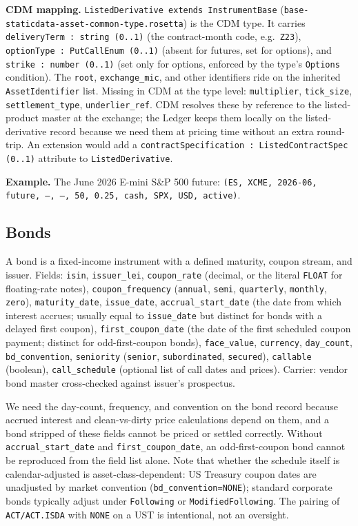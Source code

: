 \documentclass[11pt,a4paper]{article}
\begin{document}
\textbf{CDM mapping.} \texttt{ListedDerivative extends InstrumentBase} (\texttt{base-staticdata-asset-common-type.rosetta}) is the CDM type. It carries \texttt{deliveryTerm : string (0..1)} (the contract-month code, e.g.\ \texttt{Z23}), \texttt{optionType : PutCallEnum (0..1)} (absent for futures, set for options), and \texttt{strike : number (0..1)} (set only for options, enforced by the type's \texttt{Options} condition). The \texttt{root}, \texttt{exchange\_mic}, and other identifiers ride on the inherited \texttt{AssetIdentifier} list. Missing in CDM at the type level: \texttt{multiplier}, \texttt{tick\_size}, \texttt{settlement\_type}, \texttt{underlier\_ref}. CDM resolves these by reference to the listed-product master at the exchange; the Ledger keeps them locally on the listed-derivative record because we need them at pricing time without an extra round-trip. An extension would add a \texttt{contractSpecification : ListedContractSpec (0..1)} attribute to \texttt{ListedDerivative}.

\textbf{Example.} The June 2026 E-mini S\&P 500 future: \texttt{(ES, XCME, 2026-06, future, ---, ---, 50, 0.25, cash, SPX, USD, active)}.

\subsection{Bonds}

A bond is a fixed-income instrument with a defined maturity, coupon stream, and issuer. Fields: \texttt{isin}, \texttt{issuer\_lei}, \texttt{coupon\_rate} (decimal, or the literal \texttt{FLOAT} for floating-rate notes), \texttt{coupon\_frequency} (\texttt{annual}, \texttt{semi}, \texttt{quarterly}, \texttt{monthly}, \texttt{zero}), \texttt{maturity\_date}, \texttt{issue\_date}, \texttt{accrual\_start\_date} (the date from which interest accrues; usually equal to \texttt{issue\_date} but distinct for bonds with a delayed first coupon), \texttt{first\_coupon\_date} (the date of the first scheduled coupon payment; distinct for odd-first-coupon bonds), \texttt{face\_value}, \texttt{currency}, \texttt{day\_count}, \texttt{bd\_convention}, \texttt{seniority} (\texttt{senior}, \texttt{subordinated}, \texttt{secured}), \texttt{callable} (boolean), \texttt{call\_schedule} (optional list of call dates and prices). Carrier: vendor bond master cross-checked against issuer's prospectus.

We need the day-count, frequency, and convention on the bond record because accrued interest and clean-vs-dirty price calculations depend on them, and a bond stripped of these fields cannot be priced or settled correctly. Without \texttt{accrual\_start\_date} and \texttt{first\_coupon\_date}, an odd-first-coupon bond cannot be reproduced from the field list alone. Note that whether the schedule itself is calendar-adjusted is asset-class-dependent: US Treasury coupon dates are unadjusted by market convention (\texttt{bd\_convention=NONE}); standard corporate bonds typically adjust under \texttt{Following} or \texttt{ModifiedFollowing}. The pairing of \texttt{ACT/ACT.ISDA} with \texttt{NONE} on a UST is intentional, not an oversight.
\end{document}
